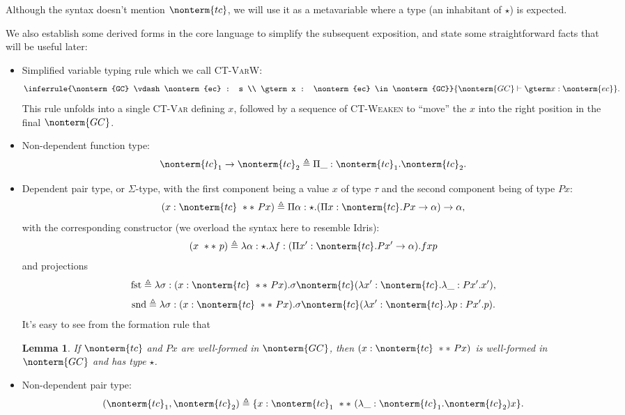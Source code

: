 \documentclass[a4paper]{article}
\newtheorem{lemma}{Lemma}
\begin{document}
Although the syntax doesn't mention $\nonterm{tc}$, we will use it as a metavariable
where a type (an inhabitant of $\star$) is expected.

\newcommand{\dast}{\ **\ }

We also establish some derived forms in the core language to simplify the subsequent exposition,
and state some straightforward facts that will be useful later:
\begin{itemize}
  \item Simplified variable typing rule which we call \textsc{CT-VarW}:
    \[
      \inferrule{\nonterm{GC} \vdash \nonterm{ec} : s \\ \gterm x : \nonterm{ec} \in \nonterm{GC}}
                {\nonterm{GC} \vdash \gterm x : \nonterm{ec}}.
    \]
    This rule unfolds into a single \textsc{CT-Var} defining $x$,
    followed by a sequence of \textsc{CT-Weaken}
    to ``move'' the $x$ into the right position in the final $\nonterm{GC}$.
  \item Non-dependent function type:
    \[
      \nonterm{tc}_1 \rightarrow \nonterm{tc}_2 \triangleq \Pi \_ : \nonterm{tc}_1. \nonterm{tc}_2.
    \]
  \item Dependent pair type, or $\Sigma$-type, with the first component being a value $x$ of type $\tau$ and the second component being of type $P x$:
    \[
      (x : \nonterm{tc} \dast P x) \triangleq \Pi \alpha : \star. (\Pi x : \nonterm{tc}. P x \rightarrow \alpha) \rightarrow \alpha,
    \]
    with the corresponding constructor (we overload the syntax here to resemble Idris):
    \[
      (x \dast p) \triangleq \lambda \alpha : \star. \lambda f : (\Pi x' : \nonterm{tc}. P x' \rightarrow \alpha). f x p
    \]
    and projections
    \[
      \text{fst} \triangleq \lambda \sigma : (x : \nonterm{tc} \dast P x). \sigma \nonterm{tc} (\lambda x' : \nonterm{tc}. \lambda \_ : P x'. x'),
    \]
    \[
      \text{snd} \triangleq \lambda \sigma : (x : \nonterm{tc} \dast P x). \sigma \nonterm{tc} (\lambda x' : \nonterm{tc}. \lambda p : P x'. p).
    \]
    It's easy to see from the formation rule that
    \begin{lemma}
      If $\nonterm{tc}$ and $P x$ are well-formed in $\nonterm{GC}$,
      then $(x : \nonterm{tc} \dast P x)$ is well-formed in $\nonterm{GC}$ and has type $\star$.
    \end{lemma}
  \item Non-dependent pair type:
    \[
      (\nonterm{tc}_1, \nonterm{tc}_2) \triangleq \{ x : \nonterm{tc}_1\ **\ (\lambda \_ : \nonterm{tc}_1. \nonterm{tc}_2) x \}.
\]
\end{itemize}
\end{document}

